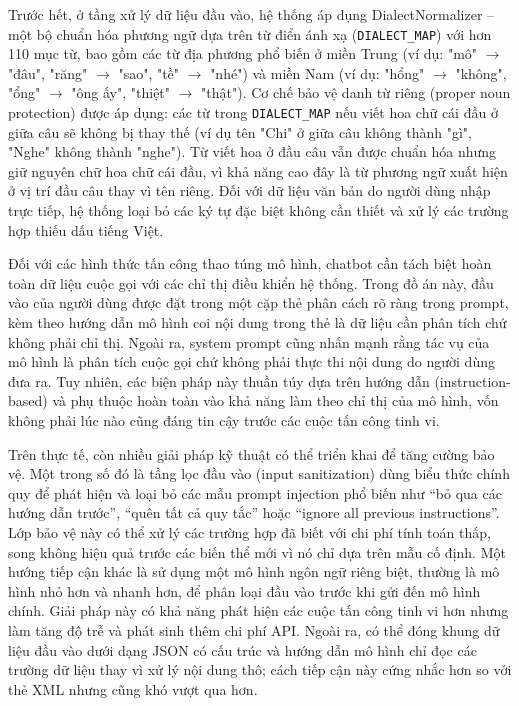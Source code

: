Trước hết, ở tầng xử lý dữ liệu đầu vào, hệ thống áp dụng DialectNormalizer -- một bộ chuẩn hóa phương ngữ dựa trên từ điển ánh xạ (\texttt{DIALECT\_MAP}) với hơn 110 mục từ, bao gồm các từ địa phương phổ biến ở miền Trung (ví dụ: "mô" $\rightarrow$ "đâu", "răng" $\rightarrow$ "sao", "tề" $\rightarrow$ "nhé") và miền Nam (ví dụ: "hổng" $\rightarrow$ "không", "ổng" $\rightarrow$ "ông ấy", "thiệt" $\rightarrow$ "thật"). Cơ chế bảo vệ danh từ riêng (proper noun protection) được áp dụng: các từ trong \texttt{DIALECT\_MAP} nếu viết hoa chữ cái đầu ở giữa câu sẽ không bị thay thế (ví dụ tên "Chi" ở giữa câu không thành "gì", "Nghe" không thành "nghe"). Từ viết hoa ở đầu câu vẫn được chuẩn hóa nhưng giữ nguyên chữ hoa chữ cái đầu, vì khả năng cao đây là từ phương ngữ xuất hiện ở vị trí đầu câu thay vì tên riêng. Đối với dữ liệu văn bản do người dùng nhập trực tiếp, hệ thống loại bỏ các ký tự đặc biệt không cần thiết và xử lý các trường hợp thiếu dấu tiếng Việt.

Đối với các hình thức tấn công thao túng mô hình, chatbot cần tách biệt hoàn toàn dữ liệu cuộc gọi với các chỉ thị điều khiển hệ thống. Trong đồ án này, đầu vào của người dùng được đặt trong một cặp thẻ phân cách rõ ràng trong prompt, kèm theo hướng dẫn mô hình coi nội dung trong thẻ là dữ liệu cần phân tích chứ không phải chỉ thị. Ngoài ra, system prompt cũng nhấn mạnh rằng tác vụ của mô hình là phân tích cuộc gọi chứ không phải thực thi nội dung do người dùng đưa ra. Tuy nhiên, các biện pháp này thuần túy dựa trên hướng dẫn (instruction-based) và phụ thuộc hoàn toàn vào khả năng làm theo chỉ thị của mô hình, vốn không phải lúc nào cũng đáng tin cậy trước các cuộc tấn công tinh vi.

Trên thực tế, còn nhiều giải pháp kỹ thuật có thể triển khai để tăng cường bảo vệ. Một trong số đó là tầng lọc đầu vào (input sanitization) dùng biểu thức chính quy để phát hiện và loại bỏ các mẫu prompt injection phổ biến như ``bỏ qua các hướng dẫn trước'', ``quên tất cả quy tắc'' hoặc ``ignore all previous instructions''. Lớp bảo vệ này có thể xử lý các trường hợp đã biết với chi phí tính toán thấp, song không hiệu quả trước các biến thể mới vì nó chỉ dựa trên mẫu cố định. Một hướng tiếp cận khác là sử dụng một mô hình ngôn ngữ riêng biệt, thường là mô hình nhỏ hơn và nhanh hơn, để phân loại đầu vào trước khi gửi đến mô hình chính. Giải pháp này có khả năng phát hiện các cuộc tấn công tinh vi hơn nhưng làm tăng độ trễ và phát sinh thêm chi phí API. Ngoài ra, có thể đóng khung dữ liệu đầu vào dưới dạng JSON có cấu trúc và hướng dẫn mô hình chỉ đọc các trường dữ liệu thay vì xử lý nội dung thô; cách tiếp cận này cứng nhắc hơn so với thẻ XML nhưng cũng khó vượt qua hơn.

